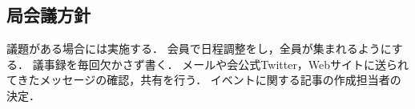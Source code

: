 \subsection*{局会議方針}


議題がある場合には実施する．
会員で日程調整をし，全員が集まれるようにする．
議事録を毎回欠かさず書く．
メールや会公式Twitter，Webサイトに送られてきたメッセージの確認，共有を行う．
イベントに関する記事の作成担当者の決定．
